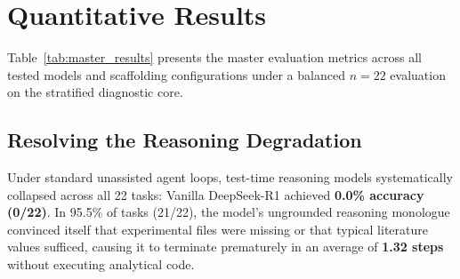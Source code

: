 \documentclass[11pt,letterpaper]{article}
\begin{document}
\begin{table}[htbp]
\centering
\small
\caption{\textbf{Master Empirical Results on BixBench Diagnostic Core ($n=22$ Per Arm, Nvidia H100 SXM5).}}
\label{tab:master_results}
\end{table}

\section{Quantitative Results}

Table~\ref{tab:master_results} presents the master evaluation metrics across all tested models and scaffolding configurations under a balanced $n=22$ evaluation on the stratified diagnostic core.

\subsection{Resolving the Reasoning Degradation}
Under standard unassisted agent loops, test-time reasoning models systematically collapsed across all 22 tasks: Vanilla DeepSeek-R1 achieved \textbf{0.0\% accuracy (0/22)}. In 95.5\% of tasks (21/22), the model's ungrounded reasoning monologue convinced itself that experimental files were missing or that typical literature values sufficed, causing it to terminate prematurely in an average of \textbf{1.32 steps} without executing analytical code. 
\end{document}
